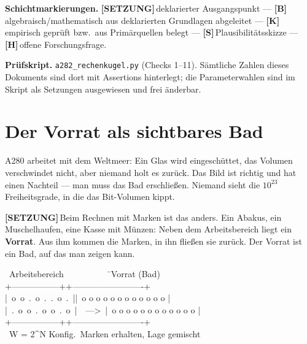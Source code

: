 \documentclass[11pt,a4paper]{article}
\newcommand{\LS}{\textcolor{laySet}{\textbf{\footnotesize\textsf{[SETZUNG]}}}\,}
\newcommand{\LK}{\textcolor{layK}{\textbf{\footnotesize\textsf{[K]}}}\,}
\newcommand{\LB}{\textcolor{layB}{\textbf{\footnotesize\textsf{[B]}}}\,}
\newcommand{\LSk}{\textcolor{layS}{\textbf{\footnotesize\textsf{[S]}}}\,}
\newcommand{\LH}{\textcolor{layH}{\textbf{\footnotesize\textsf{[H]}}}\,}
\begin{document}
\bigskip

\begingroup\small\noindent
\textbf{Schichtmarkierungen.} \LS deklarierter Ausgangspunkt ---
\LB algebraisch/mathematisch aus deklarierten Grundlagen abgeleitet ---
\LK empirisch geprüft bzw.\ aus Primärquellen belegt ---
\LSk Plausibilitätsskizze ---
\LH offene Forschungsfrage.
\par\endgroup

\bigskip

\begingroup\small\noindent
\textbf{Prüfskript.} \texttt{a282\_rechenkugel.py} (Checks 1--11). Sämtliche
Zahlen dieses Dokuments sind dort mit Assertions hinterlegt; die
Parameterwahlen sind im Skript als Setzungen ausgewiesen und frei änderbar.
\par\endgroup

\bigskip

\section{Der Vorrat als sichtbares Bad}

A280 arbeitet mit dem Weltmeer: Ein Glas wird eingeschüttet, das Volumen
verschwindet nicht, aber niemand holt es zurück. Das Bild ist richtig und hat
einen Nachteil --- man muss das Bad erschließen. Niemand sieht die $10^{23}$
Freiheitsgrade, in die das Bit-Volumen kippt.

\LS Beim Rechnen mit Marken ist das anders. Ein Abakus, ein Muschelhaufen, eine
Kasse mit Münzen: Neben dem Arbeitsbereich liegt ein \textbf{Vorrat}. Aus ihm
kommen die Marken, in ihn fließen sie zurück. Der Vorrat ist ein Bad, auf das man
zeigen kann.

\begin{center}
\begin{minipage}{0.80\textwidth}
\ttfamily\small
\begin{tabbing}
\ Arbeitsbereich\ \ \ \ \ \ \ \ \ \ \=\ Vorrat (Bad)\\[0.3em]
+-----------------+\>+-------------------------+\\
|\ o\ o\ .\ o\ .\ .\ o\ .\ |\>|\ o o o o o o o o o o o o |\\
|\ .\ o\ o\ .\ o\ o\ .\ o\ |\ \ ---\textgreater\ \>|\ o o o o o o o o o o o o |\\
+-----------------+\>+-------------------------+\\
\ W = 2\^{}N Konfig.\>\ Marken erhalten, Lage gemischt
\end{tabbing}
\end{minipage}
\end{center}
\end{document}
